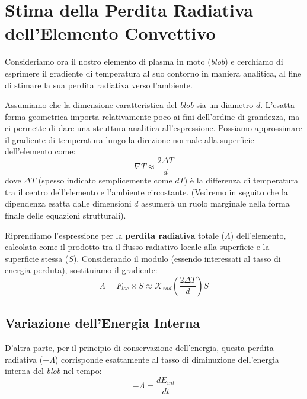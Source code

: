 \section{Stima della Perdita Radiativa dell'Elemento Convettivo}

Consideriamo ora il nostro elemento di plasma in moto (\textit{blob}) e cerchiamo di esprimere il gradiente di temperatura al suo contorno in maniera analitica, al fine di stimare la sua perdita radiativa verso l'ambiente.

Assumiamo che la dimensione caratteristica del \textit{blob} sia un diametro $d$. L'esatta forma geometrica importa relativamente poco ai fini dell'ordine di grandezza, ma ci permette di dare una struttura analitica all'espressione.
Possiamo approssimare il gradiente di temperatura lungo la direzione normale alla superficie dell'elemento come:
\begin{equation}
\nabla T \approx \frac{2 \Delta T}{d}
\end{equation}
dove $\Delta T$ (spesso indicato semplicemente come $dT$) è la differenza di temperatura tra il centro dell'elemento e l'ambiente circostante. (Vedremo in seguito che la dipendenza esatta dalle dimensioni $d$ assumerà un ruolo marginale nella forma finale delle equazioni strutturali).

Riprendiamo l'espressione per la \textbf{perdita radiativa} totale ($\Lambda$) dell'elemento, calcolata come il prodotto tra il flusso radiativo locale alla superficie e la superficie stessa ($S$). Considerando il modulo (essendo interessati al tasso di energia perduta), sostituiamo il gradiente:
\begin{equation}
\Lambda = F_{loc} \times S \approx \mathcal{K}_{rad} \left( \frac{2 \Delta T}{d} \right) S
\end{equation}

\subsection{Variazione dell'Energia Interna}

D'altra parte, per il principio di conservazione dell'energia, questa perdita radiativa ($- \Lambda$) corrisponde esattamente al tasso di diminuzione dell'energia interna del \textit{blob} nel tempo:
\begin{equation}
- \Lambda = \frac{d E_{int}}{dt}
\end{equation}

